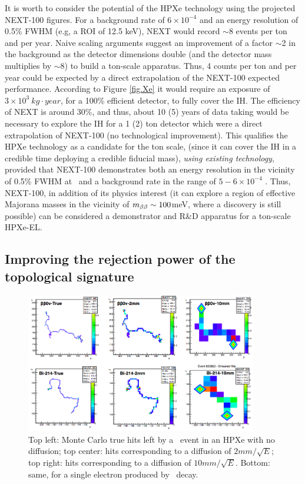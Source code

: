 It is worth to consider the potential of the HPXe technology using the projected NEXT-100 figures. For a background rate of $6 \times 10^{-4}$ \ckky and an energy resolution of 0.5\% FWHM (e.g, a ROI of 12.5 keV), NEXT would record $\sim$8 events per ton and per year. Naive scaling arguments suggest an improvement of a factor $\sim$2 in the background as the detector dimensions double (and the detector mass multiplies by $\sim$8) to build a ton-scale apparatus. Thus, 4 counts per ton and per year could be expected by a direct extrapolation of the NEXT-100 expected performance. According to Figure \ref{fig.Xe} it would require an exposure of $3 \times 10^{3}~kg\cdot year$, for a 100\% efficient detector, to fully cover the IH. The efficiency of NEXT is around 30\%, and thus, about 10 (5) years of data taking would be necessary to explore the IH for a 1 (2) ton detector which were a direct extrapolation of NEXT-100 (no technological improvement). This qualifies the HPXe technology as a candidate for the ton scale, (since it can cover the IH in a credible time deploying a credible fiducial mass), {\em using existing technology}, provided that NEXT-100 demonstrates both an
energy resolution in the vicinity of 0.5\% FWHM at \Qbb\ and a background rate in the range of 
$5-6 \times 10^{-4}$ \ckky. Thus, NEXT-100, in addition of its physics interest (it can explore a region of effective Majorana masses in the vicinity of $m_{\beta\beta} \sim 100$meV, where a discovery is still possible) can be considered a demonstrator and R\&D apparatus for a ton-scale HPXe-EL.

\subsection{Improving the rejection power of the topological signature}

\begin{figure}
\centering
\includegraphics[width=0.90\textwidth]{img2/tracks.png}
\caption{\small Top left: Monte Carlo true hits left by a \bbonu\ event in
an HPXe with no diffusion; top center: hits corresponding to a diffusion of
$2 mm/\sqrt{E}$; top right: hits corresponding to a diffusion of
$10 mm/\sqrt{E}$. Bottom: same, for a single electron produced
by \BI\ decay.} \label{fig.trks}
\end{figure}

